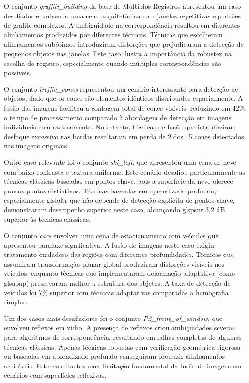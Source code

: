 O conjunto \textit{graffiti\_building} da base de Múltiplos Registros apresentou um caso desafiador envolvendo uma cena arquitetônica com janelas repetitivas e padrões de grafite complexos. A ambiguidade na correspondência resultou em diferentes alinhamentos produzidos por diferentes técnicas. Técnicas que escolheram alinhamentos subótimos introduziram distorções que prejudicaram a detecção de pequenos objetos nas janelas. Este caso ilustra a importância da robustez na escolha do registro, especialmente quando múltiplas correspondências são possíveis.

O conjunto \textit{traffic\_cones} representou um cenário interessante para detecção de objetos, dado que os cones são elementos idênticos distribuídos espacialmente. A fusão das imagens facilitou a contagem total de cones visíveis, reduzindo em 42\% o tempo de processamento comparado à abordagem de detecção em imagens individuais com rastreamento. No entanto, técnicas de fusão que introduziram desfoque excessivo nas bordas resultaram em perda de 2 dos 15 cones detectados nas imagens originais.

Outro caso relevante foi o conjunto \textit{ski\_left}, que apresentou uma cena de neve com baixo contraste e textura uniforme. Este cenário desafiou particularmente as técnicas clássicas baseadas em pontos-chave, pois a superfície da neve oferece poucos pontos distintivos. Técnicas baseadas em aprendizado profundo, especialmente gls{loftr} que não depende de detecção explícita de pontos-chave, demonstraram desempenho superior neste caso, alcançando gls{psnr} 3,2 dB superior às técnicas clássicas.

O conjunto \textit{cars} envolveu uma cena de estacionamento com veículos que apresentou paralaxe significativa. A fusão de imagens neste caso exigiu tratamento cuidadoso das regiões com diferentes profundidades. Técnicas que assumiram transformação planar global produziram distorções visíveis nos veículos, enquanto técnicas que implementaram deformação adaptativa (como gls{apap}) preservaram melhor a estrutura dos objetos. A taxa de detecção de veículos foi 7\% superior com técnicas adaptativas comparadas a homografia simples.

Um dos casos mais desafiadores foi o conjunto \textit{P2\_front\_of\_window}, que envolveu reflexos em vidro. A presença de reflexos criou ambiguidades severas para algoritmos de correspondência, resultando em falhas completas de algumas técnicas clássicas. Apenas técnicas robustas com verificação geométrica rigorosa ou baseadas em aprendizado profundo conseguiram produzir alinhamentos aceitáveis. Este caso ilustra uma limitação fundamental da fusão de imagens em cenários com superfícies reflexivas.

